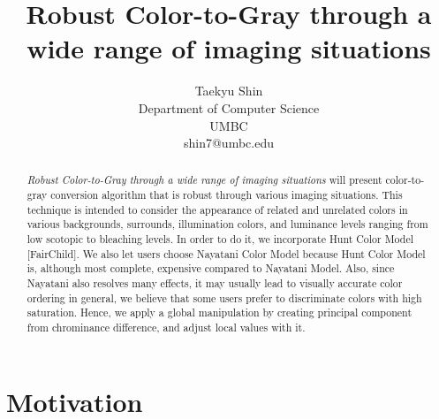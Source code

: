 \documentclass{article}
\title{Robust Color-to-Gray through a wide range of imaging situations}
\author{Taekyu Shin\\
Department of Computer Science\\
UMBC \\
shin7@umbc.edu}
\begin{document}
\maketitle

\begin{abstract}
  {\it Robust Color-to-Gray through a wide range of imaging situations  } will present color-to-gray conversion algorithm that is robust through various imaging situations. This technique is intended to consider the appearance of related and unrelated colors in various backgrounds, surrounds, illumination colors, and luminance levels ranging from low scotopic to bleaching levels. In order to do it, we incorporate Hunt Color Model [FairChild]. We also let users choose Nayatani Color Model because Hunt Color Model is, although most complete, expensive compared to Nayatani Model. Also, since Nayatani also resolves many effects, it may usually lead to visually accurate color ordering in general, we believe that some users prefer to discriminate colors with high saturation. Hence, we apply a global manipulation by creating principal component from chrominance difference, and adjust local values with it.

\end{abstract}

\section{Motivation}
\end{document}
